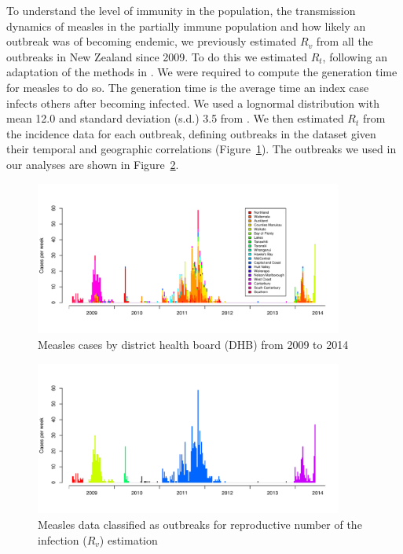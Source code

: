 \documentclass{article}
\begin{document}
To understand the level of immunity in the population, the transmission dynamics of measles in the partially immune population and how likely an outbreak was of becoming endemic, we previously estimated $R_v$ from all the outbreaks in New Zealand since 2009. To do this we estimated $R_t$, following an adaptation of the methods in \citep{obidia12,wallinga4}. We were required to compute the generation time for measles to do so. The generation time is the average time an index case infects others after becoming infected. We used a lognormal distribution with mean 12.0 and standard deviation (s.d.) 3.5 from \citep{klinkenberg11}. We then estimated $R_t$ from the incidence data for each outbreak, defining outbreaks in the dataset given their temporal and geographic correlations (Figure~\ref{fig:dhbcases}). The outbreaks we used in our analyses are shown in Figure~\ref{fig:outbreaks}.

\begin{figure}
     \centering
     \includegraphics[width=0.9\textwidth]{cases_by_dhb_2009_2014.pdf}
     \caption{Measles cases by district health board (DHB) from 2009 to 2014}
     \label{fig:dhbcases}
\end{figure}

\begin{figure}
     \centering
     \includegraphics[width=0.9\textwidth]{outbreaks_for_R0.pdf}
     \caption{Measles data classified as outbreaks for reproductive number of the infection ($R_v$) estimation}
     \label{fig:outbreaks}
\end{figure}
\end{document}
